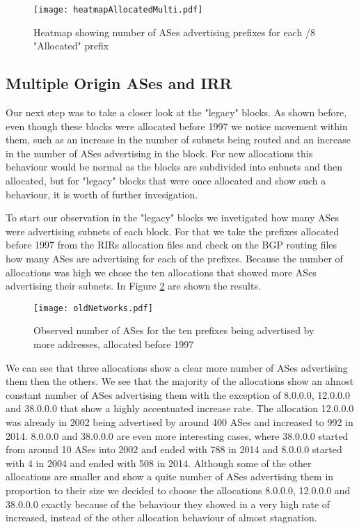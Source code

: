 \documentclass[11pt,a4paper]{scrreprt}
\begin{document}
\begin{figure}[!h]
\centering
\texttt{[image: heatmapAllocatedMulti.pdf]}
\caption{Heatmap showing number of ASes advertising prefixes for each /8 "Allocated" prefix}
\label{fig:heatmapAllocatedMulti}
\end{figure}

\clearpage
\subsection{Multiple Origin ASes and IRR}

Our next step was to take a closer look at the "legacy" blocks. As shown before, even though these blocks were allocated before 1997 we notice movement within them, such as an increase in the number of subnets being routed and an increase in the number of ASes advertising in the block. For new allocations this behaviour would be normal as the blocks are subdivided into subnets and then allocated, but for "legacy" blocks that were once allocated and show such a behaviour, it is worth of further invesigation. 

To start our observation in the "legacy" blocks we invetigated how many ASes were advertising subnets of each block. For that we take the prefixes allocated before 1997 from the RIRs allocation files and check on the BGP routing files how many ASes are advertising for each of the prefixes. Because the number of allocations was high we chose the ten allocations that showed more ASes advertising their subnets. In Figure \ref{fig:oldNetworks} are shown the results.

\begin{figure}[!h]
\centering
\texttt{[image: oldNetworks.pdf]}
\caption{Observed number of ASes for the ten prefixes being advertised by more addresses, allocated before 1997}
\label{fig:oldNetworks}
\end{figure}

We can see that three allocations show a clear more number of ASes advertising them then the others. We see that the majority of the allocations show an almost constant number of ASes advertising them with the exception of 8.0.0.0, 12.0.0.0 and 38.0.0.0 that show a highly accentuated increase rate. The allocation 12.0.0.0 was already in 2002 being advertised by around 400 ASes and increased to 992 in 2014. 8.0.0.0 and 38.0.0.0 are even more interesting cases, where 38.0.0.0 started from around 10 ASes into 2002 and ended with 788 in 2014 and 8.0.0.0 started with 4 in 2004 and ended with 508 in 2014. 
Although some of the other allocations are smaller and show a quite number of ASes advertising them in proportion to their size we decided to choose the allocations 8.0.0.0, 12.0.0.0 and 38.0.0.0 exactly because of the behaviour they showed in a very high rate of increased, instead of the other allocation behaviour of almost stagnation.
\end{document}
